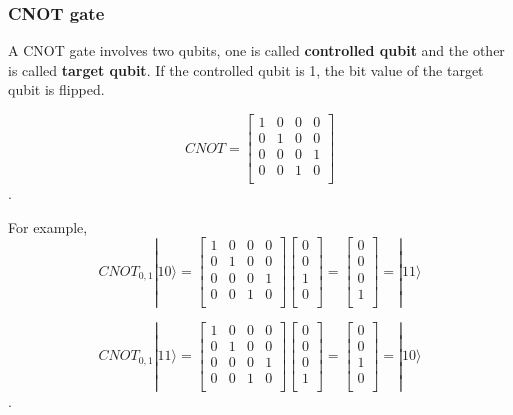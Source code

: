 \subsubsection{CNOT gate}

A CNOT gate involves two qubits, one is called \textbf{controlled qubit} and the other is called \textbf{target qubit}.  If the controlled qubit is 1, the bit value of the target qubit is flipped.

\begin{equation}
CNOT = \begin{bmatrix}
1 & 0 & 0 & 0 \\
0 & 1 & 0 & 0 \\
0 & 0 & 0 & 1 \\
0 & 0 & 1 & 0 \\
\end{bmatrix}
\end{equation}.

For example,
\begin{equation}
CNOT_{0,1}|10\rangle = 
\begin{bmatrix}
1 & 0 & 0 & 0 \\
0 & 1 & 0 & 0 \\
0 & 0 & 0 & 1 \\
0 & 0 & 1 & 0 \\
\end{bmatrix}
 \left[
\begin{array}{c}
0 \\
0 \\
1 \\
0 \\
\end{array}
\right]
=  \left[
\begin{array}{c}
0 \\
0 \\
0 \\
1 \\
\end{array}
\right] 
= |11\rangle 
\end{equation}

\begin{equation}
CNOT_{0,1}|11\rangle = 
\begin{bmatrix}
1 & 0 & 0 & 0 \\
0 & 1 & 0 & 0 \\
0 & 0 & 0 & 1 \\
0 & 0 & 1 & 0 \\
\end{bmatrix}
 \left[
\begin{array}{c}
0 \\
0 \\
0 \\
1 \\
\end{array}
\right]
=  \left[
\begin{array}{c}
0 \\
0 \\
1 \\
0 \\
\end{array}
\right] 
= |10\rangle 
\end{equation}.

